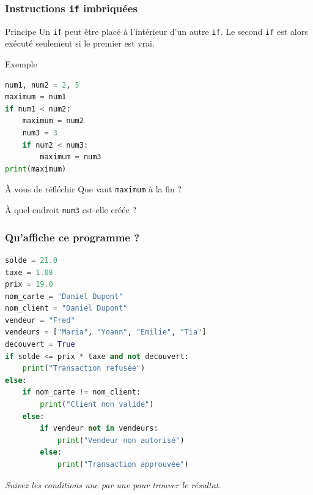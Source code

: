 \documentclass[10pt]{beamer}
\begin{document}
\begin{frame}[containsverbatim]
	\frametitle{Instructions \texttt{if} imbriquées}
	

	\begin{block}{Principe}
		Un \texttt{if} peut être placé à l'intérieur d'un autre \texttt{if}.
		Le second \texttt{if} est alors exécuté seulement si le premier est vrai.
	\end{block}
	
	\vspace{0.15cm}
	
	\begin{exampleblock}{Exemple}
		\begin{lstlisting}[language=Python]
num1, num2 = 2, 5
maximum = num1
if num1 < num2:
	maximum = num2
	num3 = 3
	if num2 < num3:
		maximum = num3
print(maximum)
		\end{lstlisting}
	\end{exampleblock}
	
	
	
	\begin{alertblock}{À vous de réfléchir}
		Que vaut \texttt{maximum} à la fin ?
		
		À quel endroit \texttt{num3} est-elle créée ?
	\end{alertblock}
	
	
\end{frame}



\begin{frame}[containsverbatim]
	\frametitle{Qu'affiche ce programme ?}

	
\begin{exampleblock}{}
\begin{lstlisting}[language=Python]
solde = 21.0
taxe = 1.08
prix = 19.0
nom_carte = "Daniel Dupont"
nom_client = "Daniel Dupont"
vendeur = "Fred"
vendeurs = ["Maria", "Yoann", "Emilie", "Tia"]
decouvert = True
if solde <= prix * taxe and not decouvert:
	print("Transaction refusée")
else:
	if nom_carte != nom_client:
		print("Client non valide")
	else:
		if vendeur not in vendeurs:
			print("Vendeur non autorisé")
		else:
			print("Transaction approuvée")
\end{lstlisting}
\end{exampleblock}
	
	\centering
	\textit{Suivez les conditions une par une pour trouver le résultat.}
	
	
\end{frame}
\end{document}
